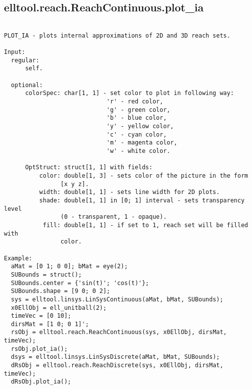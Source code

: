 \subsection{\texorpdfstring{elltool.reach.ReachContinuous.plot\_ia}{plot\_ia}}\label{method:elltool.reach.ReachContinuous.plotia}
\begin{verbatim}

PLOT_IA - plots internal approximations of 2D and 3D reach sets.

Input:
  regular:
      self.

  optional:
      colorSpec: char[1, 1] - set color to plot in following way:
                             'r' - red color,
                             'g' - green color,
                             'b' - blue color,
                             'y' - yellow color,
                             'c' - cyan color,
                             'm' - magenta color,
                             'w' - white color.

      OptStruct: struct[1, 1] with fields:
          color: double[1, 3] - sets color of the picture in the form
                [x y z].
          width: double[1, 1] - sets line width for 2D plots.
          shade: double[1, 1] in [0; 1] interval - sets transparency level
                (0 - transparent, 1 - opaque).
           fill: double[1, 1] - if set to 1, reach set will be filled with
                color.

Example:
  aMat = [0 1; 0 0]; bMat = eye(2);
  SUBounds = struct();
  SUBounds.center = {'sin(t)'; 'cos(t)'};
  SUBounds.shape = [9 0; 0 2];
  sys = elltool.linsys.LinSysContinuous(aMat, bMat, SUBounds);
  x0EllObj = ell_unitball(2);
  timeVec = [0 10];
  dirsMat = [1 0; 0 1]';
  rsObj = elltool.reach.ReachContinuous(sys, x0EllObj, dirsMat, timeVec);
  rsObj.plot_ia();
  dsys = elltool.linsys.LinSysDiscrete(aMat, bMat, SUBounds);
  dRsObj = elltool.reach.ReachDiscrete(sys, x0EllObj, dirsMat, timeVec);
  dRsObj.plot_ia();
\end{verbatim}
